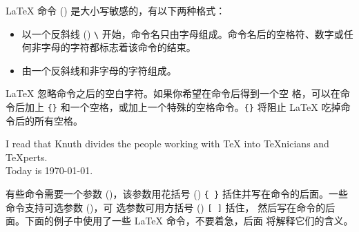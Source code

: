 
\LaTeX{} 命令 () 是大小写敏感的，有以下两种格式：
\begin{itemize}
\item 以一个反斜线 () \verb|\| 开始，命令名只由字母组成。命令名后的空格符、数字或任何非字母的字符都标志着该命令的结束。
\item 由一个反斜线和非字母的字符组成。
\end{itemize}

%
%

%
%
\label{whitespace}


\LaTeX{} 忽略命令之后的空白字符。如果你希望在命令后得到一个空
格，可以在命令后加上 \verb|{}| 和一个空格，或加上一个特殊的空格命令。\verb|{}| 将阻止 \LaTeX{} 吃掉命令后的所有空格。

\begin{example}
I read that Knuth divides the
people working with \TeX{} into
\TeX{}nicians and \TeX perts.\\
Today is \today.
\end{example}


有些命令需要一个参数 ()，该参数用花括号 () \verb|{ }| 括住并写在命令的后面。一些命令支持可选参数 ()，可 选参数可用方括号 () \verb|[ ]| 括住，
然后写在命令的后面。下面的例子中使用了一些 \LaTeX{} 命令，不要着急，后面
将解释它们的含义。


